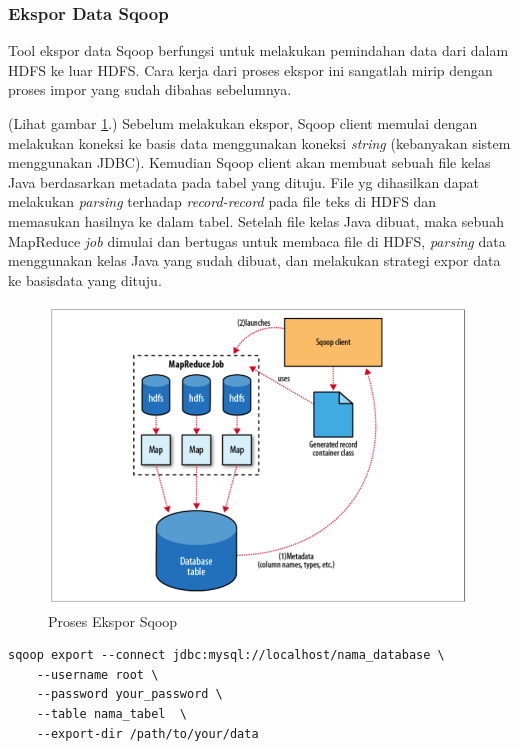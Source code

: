 \subsubsection{Ekspor Data Sqoop}
\label{sec:ekspor_data_sqoop}
Tool ekspor data Sqoop berfungsi untuk melakukan pemindahan data dari dalam HDFS ke luar HDFS. Cara kerja dari proses ekspor ini sangatlah mirip dengan proses impor yang sudah dibahas sebelumnya. 

(Lihat gambar \ref{fig:sqoop_ekspor}.) Sebelum melakukan ekspor, Sqoop client memulai dengan melakukan koneksi ke basis data menggunakan koneksi \textit{string} (kebanyakan sistem menggunakan JDBC). Kemudian Sqoop client akan membuat sebuah file kelas Java berdasarkan metadata pada tabel yang dituju. File yg dihasilkan dapat melakukan \textit{parsing} terhadap \textit{record-record} pada file teks di HDFS dan memasukan hasilnya ke dalam tabel. Setelah file kelas Java dibuat, maka sebuah MapReduce \textit{job} dimulai dan bertugas untuk membaca file di HDFS, \textit{parsing} data menggunakan kelas Java yang sudah dibuat, dan melakukan strategi expor data ke basisdata yang dituju.

\begin{figure}
	\centering
	\includegraphics[scale=0.5]{Gambar/sqoop-export.png}
	\caption[Proses Ekspor Sqoop]{Proses Ekspor Sqoop} 
	\label{fig:sqoop_ekspor}
\end{figure}

\begin{lstlisting}[caption=Perintah Ekspor Sqoop dari HDFS ke Basis Data MySQL]
	sqoop export --connect jdbc:mysql://localhost/nama_database \
	--username root \
	--password your_password \
	--table nama_tabel  \
	--export-dir /path/to/your/data
\end{lstlisting}

